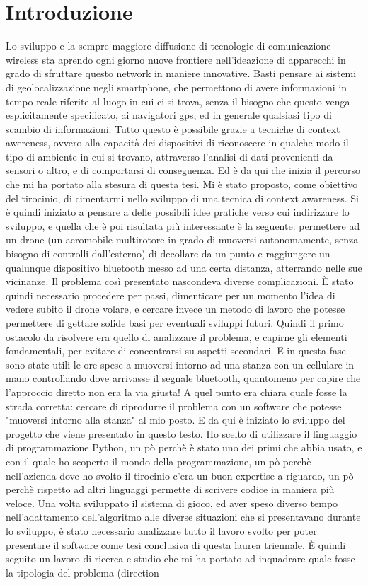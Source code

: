 \chapter*{Introduzione}
Lo sviluppo e la sempre maggiore diffusione di tecnologie di comunicazione wireless sta aprendo ogni giorno nuove frontiere nell'ideazione di apparecchi in grado di sfruttare questo network in maniere innovative. Basti pensare ai sistemi di geolocalizzazione negli smartphone, che permettono di avere informazioni in tempo reale riferite al luogo in cui ci si trova, senza il bisogno che questo venga esplicitamente specificato, ai navigatori gps, ed in generale qualsiasi tipo di scambio di informazioni. Tutto questo è possibile grazie a tecniche di context awereness, ovvero alla capacità dei dispositivi di riconoscere in qualche modo il tipo di ambiente in cui si trovano, attraverso l'analisi di dati provenienti da sensori o altro, e di comportarsi di conseguenza. Ed è da qui che inizia il percorso che mi ha portato alla stesura di questa tesi. Mi è stato proposto, come obiettivo del tirocinio, di cimentarmi nello sviluppo di una tecnica di context awareness. Si è quindi iniziato a pensare a delle possibili idee pratiche verso cui indirizzare lo sviluppo, e quella che è poi risultata più interessante è la seguente: permettere ad un drone (un aeromobile multirotore in grado di muoversi autonomamente, senza bisogno di controlli dall'esterno) di decollare da un punto e raggiungere un qualunque dispositivo bluetooth messo ad una certa distanza, atterrando nelle sue vicinanze. Il problema così presentato nascondeva diverse complicazioni. È stato quindi necessario procedere per passi, dimenticare per un momento l'idea di vedere subito il drone volare, e cercare invece un metodo di lavoro che potesse permettere di gettare solide basi per eventuali sviluppi futuri. Quindi il primo ostacolo da risolvere era quello di analizzare il problema, e capirne gli elementi fondamentali, per evitare di concentrarsi su aspetti secondari. E in questa fase sono state utili le ore spese a muoversi intorno ad una stanza con un cellulare in mano controllando dove arrivasse il segnale bluetooth, quantomeno per capire che l'approccio diretto non era la via giusta! A quel punto era chiara quale fosse la strada corretta: cercare di riprodurre il problema con un software che potesse "muoversi intorno alla stanza" al mio posto. E da qui è iniziato lo sviluppo del progetto che viene presentato in questo testo. Ho scelto di utilizzare il linguaggio di programmazione Python, un pò perchè è stato uno dei primi che abbia usato, e con il quale ho scoperto il mondo della programmazione, un pò perchè nell'azienda dove ho svolto il tirocinio c'era un buon expertise a riguardo, un pò perchè rispetto ad altri linguaggi permette di scrivere codice in maniera più veloce. Una volta sviluppato il sistema di gioco, ed aver speso diverso tempo nell'adattamento dell'algoritmo alle diverse situazioni che si presentavano durante lo sviluppo, è stato necessario analizzare tutto il lavoro svolto per poter presentare il software come tesi conclusiva di questa laurea triennale. È quindi seguito un lavoro di ricerca e studio che mi ha portato ad inquadrare quale fosse la tipologia del problema (direction 